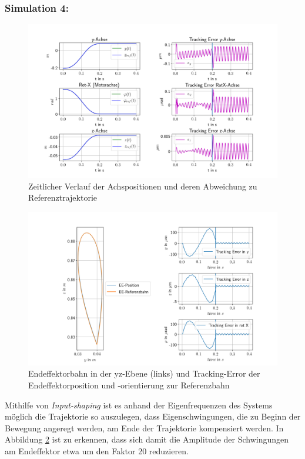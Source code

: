 \documentclass[10pt,a4paper]{iace.report}
\begin{document}
			 \subsubsection{\textcolor{blue!60!black}{Simulation 4:}}\leavevmode
				\begin{figure}[!h]
					\centering
					\includegraphics[width=0.99\linewidth]{./pics/posVerlaufAchsen_shift.png}
					\caption{Zeitlicher Verlauf der Achspositionen und deren Abweichung zu Referenztrajektorie}
					\label{fig:sim4pos}
				\end{figure}
				\begin{figure}[!h]
					\centering
					\includegraphics[width=0.99\linewidth]{./pics/endeffektor_shift.png}
					\caption{Endeffektorbahn in der yz-Ebene (links) und Tracking-Error der Endeffektorposition und -orientierung zur Referenzbahn}
					\label{fig:sim4ee}
				\end{figure}
				Mithilfe von \textit{Input-shaping} ist es anhand der Eigenfrequenzen des Systems möglich die Trajektorie so auszulegen, dass Eigenschwingungen, die zu Beginn der Bewegung angeregt werden, am Ende der Trajektorie kompensiert werden. In Abbildung \ref{fig:sim4ee} ist zu erkennen, dass sich damit die Amplitude der Schwingungen am Endeffektor etwa um den Faktor 20 reduzieren.
			\clearpage
\end{document}
